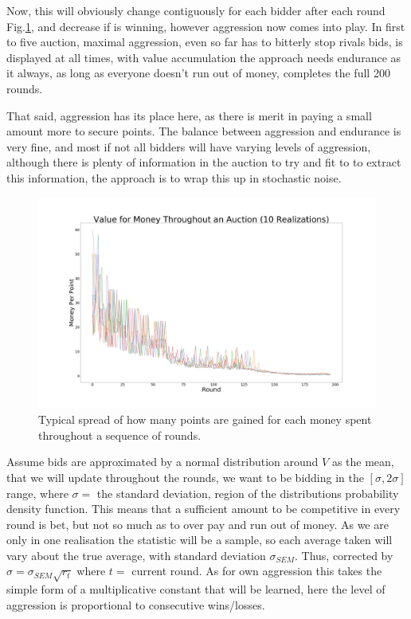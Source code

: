 \documentclass[10pt,conference,twocolumn]{IEEEtran}
\begin{document}
Now, this will obviously change contiguously for each bidder after each round Fig.\ref{ppp}, and decrease if is winning, however aggression now comes into play. In first to five auction, maximal aggression, even so far has to bitterly stop rivals bids, is displayed at all times, with value accumulation the approach needs endurance as it always, as long as everyone doesn't run out of money, completes the full 200 rounds. 

That said, aggression has its place here, as there is merit in paying a small amount more to secure points. The balance between aggression and endurance is very fine, and most if not all bidders will have varying levels of aggression, although there is plenty of information in the auction to try and fit to to extract this information, the approach is to wrap this up in stochastic noise.

\begin{figure}[!h]
    \centering
    \includegraphics[width=\linewidth]{PPP.png}
    \caption{Typical spread of how many points are gained for each money spent throughout a sequence of rounds.}
    \label{ppp}
\end{figure}

Assume bids are approximated by a normal distribution around $V$ as the mean, that we will update throughout the rounds, we want to be bidding in the $[\sigma,2\sigma]$ range, where $\sigma =$ the standard deviation, region of the distributions probability density function. This means that a sufficient amount to be competitive in every round is bet, but not so much as to over pay and run out of money. As we are only in one realisation the statistic will be a sample, so each average taken will vary about the true average, with standard deviation $\sigma_{SEM}$. Thus, corrected by $\sigma = \sigma_{SEM} \sqrt{r_t}$ where $t=$ current round. As for own aggression this takes the simple form of a multiplicative constant that will be learned, here the level of aggression is proportional to consecutive wins/losses.
\end{document}
